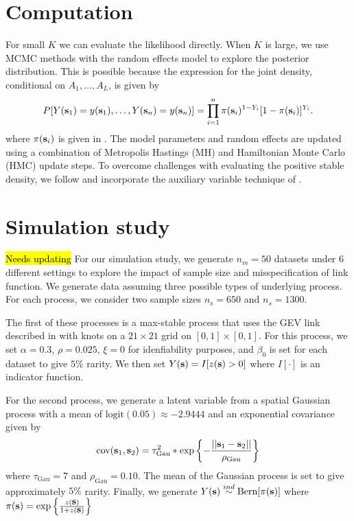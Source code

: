 \documentclass[11pt]{article}
\begin{document}
\section{Computation}\label{rbs:comp}
For small $K$ we can evaluate the likelihood directly.
When $K$ is large, we use MCMC methods with the random effects model to explore the posterior distribution.
This is possible because the expression for the joint density, conditional on $A_1, \ldots, A_L$, is given by
\begin{align}
	P[Y(\mbox{\bf s}_1)=y(\mbox{\bf s}_1),\ldots,Y(\mbox{\bf s}_n)=y(\mbox{\bf s}_n)] = \prod_{ i = 1 }^{ n } \pi(\mbox{\bf s}_i)^{ 1 - Y_i } [1 - \pi(\mbox{\bf s}_i)]^{ Y_i }.
\end{align}
where $\pi(\mbox{\bf s}_i)$ is given in .
The model parameters and random effects are updated using a combination of Metropolis Hastings (MH) and Hamiltonian Monte Carlo (HMC) update steps.
To overcome challenges with evaluating the positive stable density, we follow \citet{Reich2012} and incorporate the auxiliary variable technique of \citet{Stephenson2009}.

\section{Simulation study}\label{rbs:sim}

\hl{Needs updating}
For our simulation study, we generate $n_m = 50$ datasets under 6 different settings to explore the impact of sample size and misspecification of link function.
We generate data assuming three possible types of underlying process.
For each process, we consider two sample sizes $n_s = 650$ and $n_s = 1300$.

The first of these processes is a max-stable process that uses the GEV link described in  with knots on a $21 \times 21$ grid on $[0, 1] \times [0, 1]$.
For this process, we set $\alpha = 0.3$, $\rho = 0.025$, $\xi = 0$ for idenfiability purposes, and $\beta_0$ is set for each dataset to give $5\%$ rarity.
We then set $Y(\mbox{\bf s}) = I[z(\mbox{\bf s}) > 0]$ where $I[\cdot]$ is an indicator function.

For the second process, we generate a latent variable from a spatial Gaussian process with a mean of $\text{logit}(0.05) \approx -2.9444$ and an exponential covariance given by
\begin{align}
  \text{cov}(\mbox{\bf s}_1, \mbox{\bf s}_2) = \tau_\text{Gau}^2 * \exp\left\{- \frac{||\mbox{\bf s}_1 - \mbox{\bf s}_2||}{\rho_\text{Gau}}\right\}
\end{align}
where $\tau_\text{Gau} = 7$ and $\rho_\text{Gau} = 0.10$.
The mean of the Gaussian process is set to give approximately $5\%$ rarity.
Finally, we generate $Y(\mbox{\bf s}) \stackrel{ind}{\sim} \text{Bern}[\pi(\mbox{\bf s})]$
where $\pi(\mbox{\bf s}) = \exp\left\{ \frac{z(\mbox{\bf s})}{1 + z(\mbox{\bf s})} \right\}$
\end{document}

